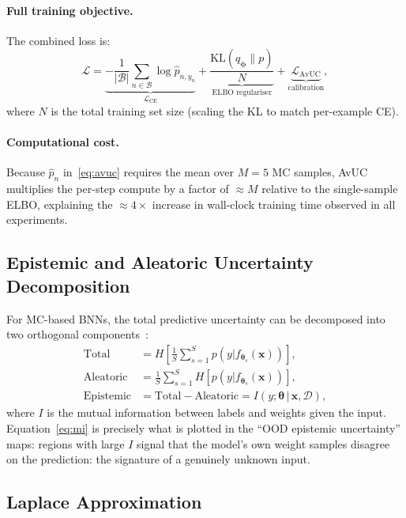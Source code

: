 \documentclass[12pt,a4paper]{article}
\newcommand{\btheta}{\bm{\theta}}
\newcommand{\cD}{\mathcal{D}}
\newcommand{\KL}{\mathrm{KL}}
\begin{document}
\paragraph{Full training objective.}
The combined loss is:
\begin{equation}
  \mathcal{L}
    = \underbrace{-\frac{1}{|\mathcal{B}|}\sum_{n\in\mathcal{B}}
        \log\hat{p}_{n,y_n}}_{\mathcal{L}_{\mathrm{CE}}}
    + \underbrace{\frac{\KL(q_{\bm\phi}\|p)}{N}}_{\text{ELBO regulariser}}
    + \underbrace{\mathcal{L}_{\mathrm{AvUC}}}_{\text{calibration}},
  \label{eq:avuc_total}
\end{equation}
where $N$ is the total training set size (scaling the KL to match
per-example CE).

\paragraph{Computational cost.}
Because $\hat{p}_n$ in~\eqref{eq:avuc} requires the mean over $M=5$ MC
samples, AvUC multiplies the per-step compute by a factor of $\approx M$
relative to the single-sample ELBO, explaining the $\approx 4\times$ increase
in wall-clock training time observed in all experiments.

\subsection{Epistemic and Aleatoric Uncertainty Decomposition}
\label{sec:theory:unc_decomp}

For MC-based BNNs, the total predictive uncertainty can be decomposed into
two orthogonal components~\citep{goan2020bayesian}:
\begin{align}
  \text{Total}   &= H\!\left[\frac{1}{S}\sum_{s=1}^{S} p(y|f_{\btheta_s}(\bm{x}))\right], \\
  \text{Aleatoric}&= \frac{1}{S}\sum_{s=1}^{S} H\!\left[p(y|f_{\btheta_s}(\bm{x}))\right], \\
  \text{Epistemic}&= \text{Total} - \text{Aleatoric}
    = I\!\left(y;\btheta\,|\,\bm{x},\cD\right),
  \label{eq:mi}
\end{align}
where $I$ is the mutual information between labels and weights given the
input. Equation~\eqref{eq:mi} is precisely what is plotted in the
``OOD epistemic uncertainty'' maps: regions with large $I$ signal that
the model's own weight samples disagree on the prediction: the signature
of a genuinely unknown input.

\subsection{Laplace Approximation}
\label{sec:theory:la}
\end{document}
